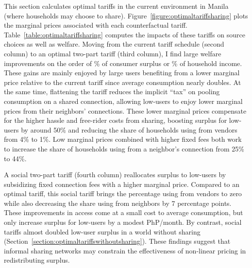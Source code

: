 \documentclass[12pt]{article}
\begin{document}
This section calculates optimal tariffs in the current environment in Manila (where households may choose to share).  Figure~\ref{figure:optimaltariffsharing} plots the marginal prices associated with each counterfactual tariff.  Table~\ref{table:optimaltariffsharing} computes the impacts of these tariffs on source choices as well as welfare.  Moving from the current tariff schedule (second column) to an optimal two-part tariff (third column), I find large welfare improvements on the order of \unskip\% of consumer surplus or \unskip\% of household income.  These gains are mainly enjoyed by large users benefiting from a lower marginal price relative to the current tariff since average consumption nearly doubles.  At the same time, flattening the tariff reduces the implicit ``tax'' on pooling consumption on a shared connection, allowing low-users to enjoy lower marginal prices from their neighbors' connections.  These lower marginal prices compensate for the higher hassle and free-rider costs from sharing, boosting surplus for low-users by around 50\% and reducing the share of households using from vendors from 4\% to 1\%.  Low marginal prices combined with higher fixed fees both work to increase the share of households using from a neighbor's connection from 25\% to 44\%.  


A social two-part tariff (fourth column) reallocates surplus to low-users by subsidizing fixed connection fees with a higher marginal price.  Compared to an optimal tariff, this social tariff brings the percentage using from vendors to zero while also decreasing the share using from neighbors by 7 percentage points.  These improvements in access come at a small cost to average consumption, but only increase surplus for low-users by a modest PhP/month.  By contrast, social tariffs almost doubled low-user surplus in a world without sharing (Section~\ref{section:optimaltariffswithoutsharing}).  These findings suggest that informal sharing networks may constrain the effectiveness of non-linear pricing in redistributing surplus.
\end{document}
